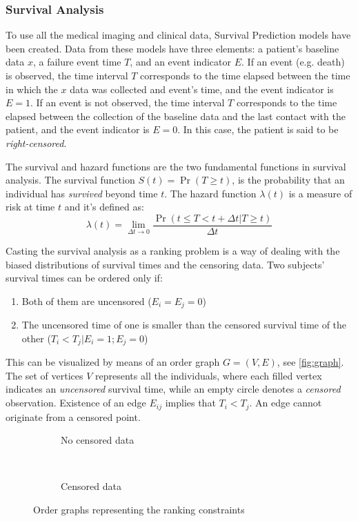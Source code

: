 \subsubsection{Survival Analysis}

To use all the medical imaging and clinical data, Survival Prediction models have been created. 
Data from these models have three elements: a patient's baseline data \( x \), a failure event 
time \( T \), and an event indicator \( E \). If an event (e.g. death) is observed, the time 
interval \( T \) corresponds to the time elapsed between the time in which the \( x \)
data was collected and event's time, and the event indicator is \( E = 1 \). If an
event is not observed, the time interval \( T \) corresponds to the time elapsed between
the collection of the baseline data and the last contact with the patient, and the 
event indicator is \( E = 0 \). In this case, the patient is said to be
\emph{right-censored}.
~\cite{medical:deep-surv}

The survival and hazard functions are the two fundamental functions in survival analysis. The
survival function \( S(t) = \Pr(T \ge t) \), is the probability that an individual has
\emph{survived} beyond time \( t \). The hazard function \( \lambda(t) \) is a measure of risk at 
time \( t \) and it's defined as:
~\cite{medical:cox}
\[
  \lambda(t) = \lim_{\Delta t \rightarrow 0}
  \frac{\Pr(t \le T < t + \Delta t | T \ge t)}{\Delta t}
\]

Casting the survival analysis as a ranking problem is a way of dealing with the biased
distributions of survival times and the censoring data. Two subjects' survival times can be 
ordered only if:
\begin{enumerate}[noitemsep, topsep=0pt]
  \item Both of them are uncensored (\( E_i = E_j = 0\))
  \item The uncensored time of one is smaller than the censored survival time of the other
  (\( T_i < T_j | E_i = 1; E_j = 0 \))
\end{enumerate}

This can be visualized by means of an order graph \( G = (V, E) \), see \autoref{fig:graph}.
The set of vertices \( V \) represents all the individuals, where each filled vertex indicates
an \emph{uncensored} survival time, while an empty circle denotes a \emph{censored} observation.
Existence of an edge \( E_{ij} \) implies that \( T_i < T_j \). An edge cannot originate 
from a censored point.

\begin{figure}
  \centering
  \begin{subfigure}[b]{.4\textwidth}
    \centering
    
    \caption{No censored data}
  \end{subfigure}
  ~
  \begin{subfigure}[b]{.4\textwidth}
    \centering
    
    \caption{Censored data}
  \end{subfigure}

  \caption{Order graphs representing the ranking constraints \label{fig:graph}}
\end{figure}

